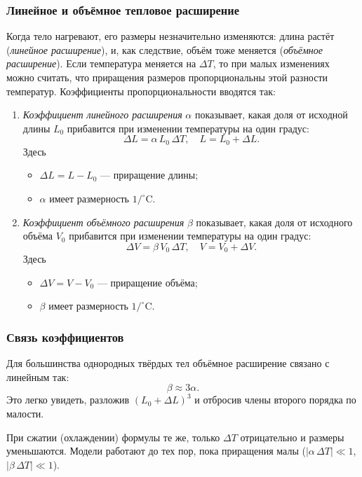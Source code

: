 \documentclass[12pt, a4paper]{article}%
\begin{document}
\subsubsection*{Линейное и объёмное тепловое расширение}
Когда тело нагревают, его размеры незначительно изменяются: длина растёт (\textit{линейное расширение}), и, как следствие, объём тоже меняется (\textit{объёмное расширение}). Если температура меняется на $\Delta T$, то при малых изменениях можно считать, что приращения размеров пропорциональны этой разности температур. Коэффициенты пропорциональности вводятся так:
\begin{enumerate}
  \item \textit{Коэффициент линейного расширения} $\alpha$ показывает, какая доля от исходной длины $L_0$ прибавится при изменении температуры на один градус:
  \[
    \Delta L = \alpha\,L_0\,\Delta T,
    \quad
    L = L_0 + \Delta L.
  \]
  Здесь
  \begin{itemize}
    \item $\Delta L = L - L_0$ — приращение длины;
    \item $\alpha$ имеет размерность $1/^\circ\mathrm C$.
  \end{itemize}
  \item \textit{Коэффициент объёмного расширения} $\beta$ показывает, какая доля от исходного объёма $V_0$ прибавится при изменении температуры на один градус:
  \[
    \Delta V = \beta\,V_0\,\Delta T,
    \quad
    V = V_0 + \Delta V.
  \]
  Здесь
  \begin{itemize}
    \item $\Delta V = V - V_0$ — приращение объёма;
    \item $\beta$ имеет размерность $1/^\circ\mathrm C$.
  \end{itemize}
\end{enumerate}

\subsubsection*{Связь коэффициентов}
Для большинства однородных твёрдых тел объёмное расширение связано с линейным так:
\[
  \beta \approx 3\alpha.
\]
Это легко увидеть, разложив $(L_0+\Delta L)^3$ и отбросив члены второго порядка по малости.


При сжатии (охлаждении) формулы те же, только $\Delta T$ отрицательно и размеры уменьшаются. Модели работают до тех пор, пока приращения малы ($|\alpha\,\Delta T|\ll1$, $|\beta\,\Delta T|\ll1$).
\end{document}
